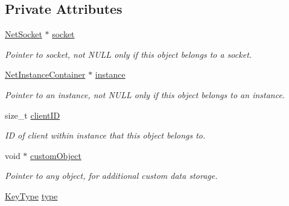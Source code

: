 \subsection*{Private Attributes}
\begin{DoxyCompactItemize}
\item 
\hypertarget{class_net_completion_key_ae4108c1fd628613e8b36eb8d11ac4f5e}{
\hyperlink{class_net_socket}{NetSocket} $\ast$ \hyperlink{class_net_completion_key_ae4108c1fd628613e8b36eb8d11ac4f5e}{socket}}
\label{class_net_completion_key_ae4108c1fd628613e8b36eb8d11ac4f5e}

\begin{DoxyCompactList}\small\item\em Pointer to socket, not NULL only if this object belongs to a socket. \item\end{DoxyCompactList}\item 
\hypertarget{class_net_completion_key_a8f408ea2a3985e19cf3381fcbcae3318}{
\hyperlink{class_net_instance_container}{NetInstanceContainer} $\ast$ \hyperlink{class_net_completion_key_a8f408ea2a3985e19cf3381fcbcae3318}{instance}}
\label{class_net_completion_key_a8f408ea2a3985e19cf3381fcbcae3318}

\begin{DoxyCompactList}\small\item\em Pointer to an instance, not NULL only if this object belongs to an instance. \item\end{DoxyCompactList}\item 
\hypertarget{class_net_completion_key_a36d25bfffcd6bb9adad4c243cd4430e0}{
size\_\-t \hyperlink{class_net_completion_key_a36d25bfffcd6bb9adad4c243cd4430e0}{clientID}}
\label{class_net_completion_key_a36d25bfffcd6bb9adad4c243cd4430e0}

\begin{DoxyCompactList}\small\item\em ID of client within instance that this object belongs to. \item\end{DoxyCompactList}\item 
\hypertarget{class_net_completion_key_a2d939786562a2b929045159eee0836b3}{
void $\ast$ \hyperlink{class_net_completion_key_a2d939786562a2b929045159eee0836b3}{customObject}}
\label{class_net_completion_key_a2d939786562a2b929045159eee0836b3}

\begin{DoxyCompactList}\small\item\em Pointer to any object, for additional custom data storage. \item\end{DoxyCompactList}\item 
\hypertarget{class_net_completion_key_ab688ca4ac39575c1e1edecbd7fe09a10}{
\hyperlink{class_net_completion_key_a129b5d89d5f2ac58abcc9872adc85d32}{KeyType} \hyperlink{class_net_completion_key_ab688ca4ac39575c1e1edecbd7fe09a10}{type}}
\label{class_net_completion_key_ab688ca4ac39575c1e1edecbd7fe09a10}


\end{DoxyCompactItemize}
